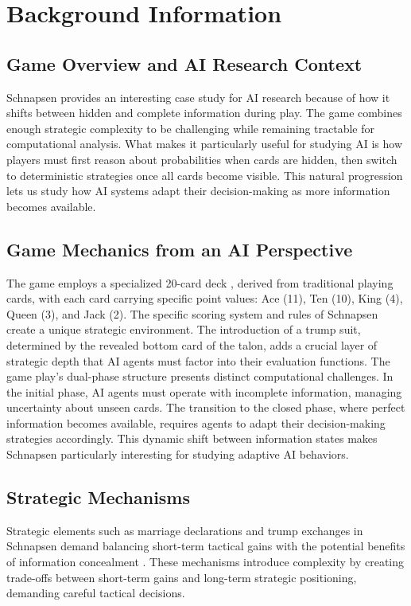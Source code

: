 \documentclass[runningheads]{llncs}
\begin{document}
\section{Background Information}
\subsection{Game Overview and AI Research Context}
Schnapsen provides an interesting case study for AI research \cite{ref_schnapsen1} because of how it shifts between hidden and complete information during play. The game combines enough strategic complexity to be challenging while remaining tractable for computational analysis. What makes it particularly useful for studying AI is how players must first reason about probabilities when cards are hidden, then switch to deterministic strategies once all cards become visible. This natural progression lets us study how AI systems adapt their decision-making as more information becomes available.

\subsection{Game Mechanics from an AI Perspective}
The game employs a specialized 20-card deck \cite{ref_britannica}, derived from traditional playing cards, with each card carrying specific point values: Ace (11), Ten (10), King (4), Queen (3), and Jack (2). The specific scoring system and rules of Schnapsen \cite{ref_schnopsn} create a unique strategic environment. The introduction of a trump suit, determined by the revealed bottom card of the talon, adds a crucial layer of strategic depth that AI agents must factor into their evaluation functions. The game play's dual-phase structure presents distinct computational challenges. In the initial phase, AI agents must operate with incomplete information, managing uncertainty about unseen cards. The transition to the closed phase, where perfect information becomes available, requires agents to adapt their decision-making strategies accordingly. This dynamic shift between information states makes Schnapsen particularly interesting for studying adaptive AI behaviors. 

\subsection{Strategic Mechanisms}
Strategic elements such as marriage declarations and trump exchanges in Schnapsen \cite{ref_pagat} demand balancing short-term tactical gains with the potential benefits of information concealment \cite{ref_ieee_card}. These mechanisms introduce complexity by creating trade-offs between short-term gains and long-term strategic positioning, demanding careful tactical decisions.
\end{document}
